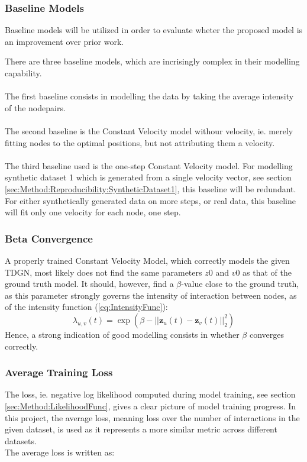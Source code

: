 \subsubsection{Baseline Models}
\label{sec:Method:Evaluation:BaselineModels}
Baseline models will be utilized in order to evaluate wheter the proposed model is an improvement over prior work.

There are three baseline models, which are incrisingly complex in their modelling capability.
\\\\
The first baseline consists in modelling the data by taking the average intensity of the nodepairs.
\\\\
The second baseline is the Constant Velocity model withour velocity, ie. merely fitting nodes to the optimal positions, but not attributing them a velocity.
\\\\
The third baseline used is the one-step Constant Velocity model.
For modelling synthetic dataset 1 which is generated from a single velocity vector, see section \ref{sec:Method:Reproducibility:SyntheticDataset1}, this baseline will be redundant.
For either synthetically generated data on more steps, or real data, this baseline will fit only one velocity for each node, one step.


\subsubsection{Beta Convergence}
\label{sec:Method:Evaluation:BetaConvergence}
A properly trained Constant Velocity Model, which correctly models the given TDGN, most likely does not find the same parameters $z0$ and $v0$ as that of the ground truth model.
It should, however, find a $\beta$-value close to the ground truth, as this parameter strongly governs the intensity of interaction between nodes, as of the intensity function (\ref{eq:IntensityFunc}):
\begin{equation*}
    \lambda_{u,v}(t)
    =
    \exp \left(\beta - ||\textbf{z}_u(t) - \textbf{z}_v(t)||_2^2\right)
\end{equation*}
Hence, a strong indication of good modelling consists in whether $\beta$ converges correctly.


\subsubsection{Average Training Loss}
\label{sec:Method:Evaluation:Loss}
The loss, ie. negative log likelihood computed during model training, see section \ref{sec:Method:LikelihoodFunc}, gives a clear picture of model training progress.
In this project, the average loss, meaning loss over the number of interactions in the given dataset, is used as it represents a more similar metric across different datasets.
\\
The average loss is written as:

